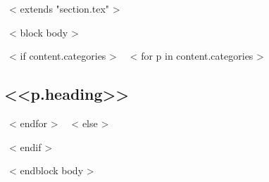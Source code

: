 ~< extends "section.tex" >~

~< block body >~
\renewcommand*{\bibfont}{\small}

~< if content.categories >~
    ~< for p in content.categories >~
    \subsection{<<p.heading>>}
    \begin{refsection}
    \nocite{*}
    \printbibliography[heading=none,prefixnumbers=<<p.prefix>>]
    \end{refsection}
    ~< endfor >~
~< else >~
    \begin{refsection}
    \nocite{*}
    \printbibliography[heading=none,prefixnumbers=]
    \end{refsection}
~< endif >~

~< endblock body >~
